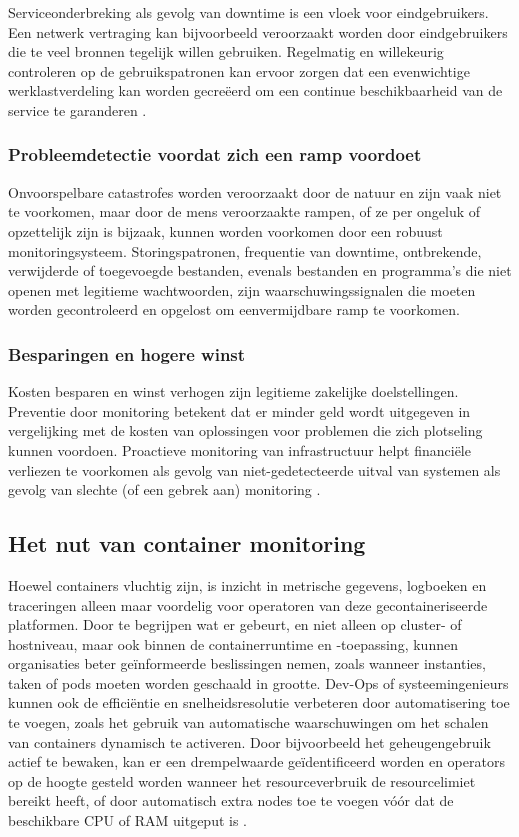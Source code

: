 Serviceonderbreking als gevolg van downtime is een vloek voor eindgebruikers. Een netwerk vertraging kan bijvoorbeeld veroorzaakt worden door eindgebruikers die te veel bronnen tegelijk willen gebruiken. Regelmatig en willekeurig controleren op de gebruikspatronen kan ervoor zorgen dat een evenwichtige werklastverdeling kan worden gecreëerd om een ​​continue beschikbaarheid van de service te garanderen \autocite{Matrix2016}.

\subsubsection{Probleemdetectie voordat zich een ramp voordoet}

Onvoorspelbare catastrofes worden veroorzaakt door de natuur en zijn vaak niet te voorkomen, maar door de mens veroorzaakte rampen, of ze per ongeluk of opzettelijk zijn is bijzaak, kunnen worden voorkomen door een robuust monitoringsysteem. Storingspatronen, frequentie van downtime, ontbrekende, verwijderde of toegevoegde bestanden, evenals bestanden en programma's die niet openen met legitieme wachtwoorden, zijn waarschuwingssignalen die moeten worden gecontroleerd en opgelost om een ​​vermijdbare ramp te voorkomen\autocite{Matrix2016}.

\subsubsection{Besparingen en hogere winst}

Kosten besparen en winst verhogen zijn legitieme zakelijke doelstellingen. Preventie door monitoring betekent dat er minder geld wordt uitgegeven in vergelijking met de kosten van oplossingen voor problemen die zich plotseling kunnen voordoen. Proactieve monitoring van infrastructuur helpt financiële verliezen te voorkomen als gevolg van niet-gedetecteerde uitval van systemen als gevolg van slechte (of een gebrek aan) monitoring \autocite{Matrix2016}. 

\subsection{Het nut van container monitoring}

Hoewel containers vluchtig zijn, is inzicht in metrische gegevens, logboeken en traceringen alleen maar voordelig voor operatoren van deze gecontaineriseerde platformen. Door te begrijpen wat er gebeurt, en niet alleen op cluster- of hostniveau, maar ook binnen de containerruntime en -toepassing, kunnen organisaties beter geïnformeerde beslissingen nemen, zoals wanneer instanties, taken of pods moeten worden geschaald in grootte. Dev-Ops of systeemingenieurs kunnen ook de efficiëntie en snelheidsresolutie verbeteren door automatisering toe te voegen, zoals het gebruik van automatische waarschuwingen om het schalen van containers dynamisch te activeren. Door bijvoorbeeld het geheugengebruik actief te bewaken, kan er een drempelwaarde geïdentificeerd worden en operators op de hoogte gesteld worden wanneer het resourceverbruik de resourcelimiet bereikt heeft, of door automatisch extra nodes toe te voegen vóór dat de beschikbare CPU of RAM uitgeput is \autocite{AWS2021}. 

